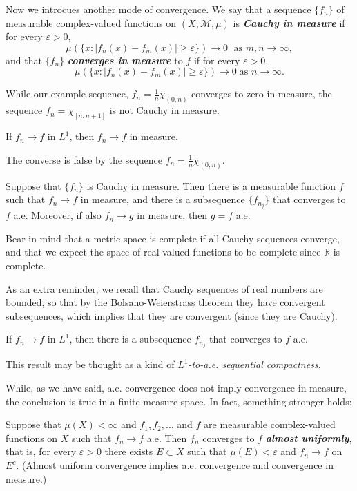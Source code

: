 \documentclass{article}
\theoremstyle{definition}
\numberwithin{equation}{section}
\newcommand{\R}{\mathbb{R}}
\begin{document}
	Now we introcues another mode of convergence. We say that a sequence $\{f_n\}$ of measurable complex-valued functions on $(X,\mathcal{M},\mu)$ is \textbf{\textit{Cauchy in measure}} if for every $\varepsilon>0$, 
	\[\mu(\{x:|f_n(x)-f_m(x)|\geq\varepsilon\})\to0\;\text{ as }m,n\to\infty,\]
	and that $\{f_n\}$ \textbf{\textit{converges in measure}} to $f$ if for every $\varepsilon>0$,
	\[\mu(\{x:|f_n(x)-f_m(x)|\geq\varepsilon\})\to0\;\text{as }n\to\infty.\]
	
	While our example sequence, $f_n=\frac{1}{n}\chi_{(0,n)}$ converges to zero in measure, the sequence $f_n=\chi_{[n,n+1]}$ is not Cauchy in measure.
	
	\begin{prop}
		If $f_n\to f$ in $L^1$, then $f_n\to f$ in measure.
	\end{prop}
	\begin{remark}
		The converse is false by the sequence $f_n=\frac{1}{n}\chi_{(0,n)}$.
	\end{remark}
	\begin{thm}
		Suppose that $\{f_n\}$ is Cauchy in measure. Then there is a measurable function $f$ such that $f_n\to f$ in measure, and there is a subsequence $\{f_{n_j}\}$ that converges to $f$ a.e. Moreover, if also $f_n\to g$ in measure, then $g=f$ a.e.
	\end{thm}
	\begin{remark}
		Bear in mind that a metric space is complete if all Cauchy sequences converge, and that we expect the space of real-valued functions to be complete since $\R$ is complete.
	\end{remark}
	\begin{remark}
		As an extra reminder, we recall that Cauchy sequences of real numbers are bounded, so that by the Bolsano-Weierstrass theorem they have convergent subsequences, which implies that they are convergent (since they are Cauchy).
	\end{remark}
	\begin{thm}
		If $f_n\to f$ in $L^1$, then there is a subsequence $f_{n_j}$ that converges to $f$ a.e.
	\end{thm}
	\begin{remark}
		This result may be thought as a kind of \textit{$L^1$-to-a.e. sequential compactness}.
	\end{remark}
	While, as we have said, a.e. convergence does not imply convergence in measure, the conclusion is true in a finite measure space. In fact, something stronger holds:
	\begin{thm}[Egoroff]
		Suppose that $\mu(X)<\infty$ and $f_1,f_2,\ldots$ and $f$ are measurable complex-valued functions on $X$ such that $f_n\to f$ a.e. Then $f_n$ converges to $f$ \textbf{\textit{almost uniformly}}, that is, for every $\varepsilon>0$ there exists $E\subset X$ such that $\mu(E)<\varepsilon$ and $f_n\to f$ on $E^c$. (Almost uniform convergence implies a.e. convergence and convergence in measure.)
	\end{thm}
\end{document}
